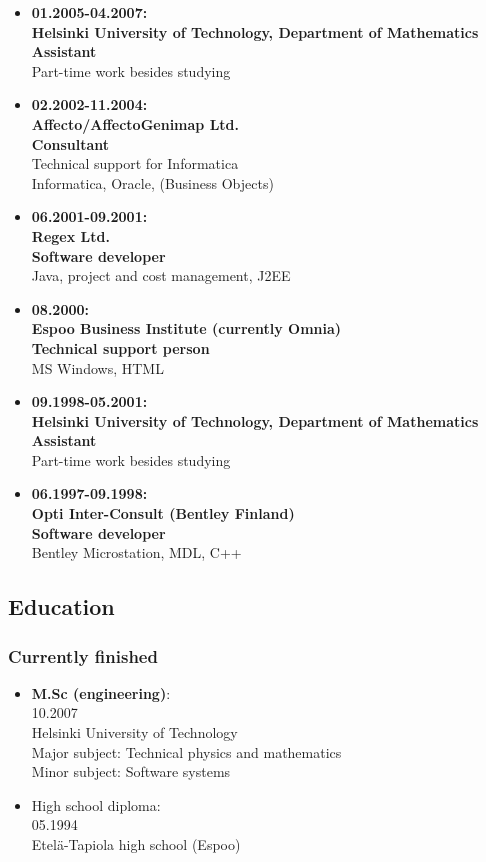 \documentclass[a4paper,12pt]{article}
\begin{document}
\begin{itemize}
{walks inside generalized quadrilaterals}" and page (in Finnish)
on \href{http://math.tkk.fi/~mnummeli/tutkimus/konformi.html}
{conformal mapping with example code in Matlab}.
\item
{\bf 01.2005-04.2007:\\
Helsinki University of Technology, Department of Mathematics \\
Assistant} \\
Part-time work besides studying
\item
{\bf 02.2002-11.2004:\\
Affecto/AffectoGenimap Ltd. \\
Consultant} \\
Technical support for Informatica \\
Informatica, Oracle, (Business Objects)
\item
{\bf 06.2001-09.2001:\\
Regex Ltd. \\
Software developer} \\
Java, project and cost management, J2EE
\item
{\bf 08.2000:\\
Espoo Business Institute (currently Omnia) \\
Technical support person} \\
MS Windows, HTML
\item
{\bf 09.1998-05.2001:\\
Helsinki University of Technology, Department of Mathematics \\
Assistant} \\
Part-time work besides studying
\item
{\bf 06.1997-09.1998:\\
Opti Inter-Consult (Bentley Finland)\\
Software developer} \\
Bentley Microstation, MDL, C++
\end{itemize}

\subsection*{Education}

\subsubsection*{Currently finished}
\begin{itemize}
\item
{\bf M.Sc (engineering)}: \\
10.2007 \\
Helsinki University of Technology \\
Major subject: Technical physics and mathematics \\
Minor subject: Software systems
\item
High school diploma: \\
05.1994 \\
Etel\"a-Tapiola high school (Espoo)
\end{itemize}
\end{document}
